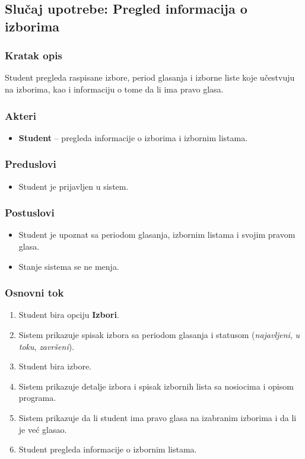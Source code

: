 \subsection{Slučaj upotrebe: Pregled informacija o izborima}

\subsubsection*{Kratak opis}
Student pregleda raspisane izbore, period glasanja i izborne liste koje učestvuju na izborima, kao i informaciju o tome da li ima pravo glasa.

\subsubsection*{Akteri}
\begin{itemize}
    \item \textbf{Student} -- pregleda informacije o izborima i izbornim listama.
\end{itemize}

\subsubsection*{Preduslovi}
\begin{itemize}
    \item Student je prijavljen u sistem.
\end{itemize}

\subsubsection*{Postuslovi}
\begin{itemize}
    \item Student je upoznat sa periodom glasanja, izbornim listama i svojim pravom glasa.
    \item Stanje sistema se ne menja.
\end{itemize}

\subsubsection*{Osnovni tok}
\begin{enumerate}
    \item Student bira opciju \textbf{Izbori}.
    \item Sistem prikazuje spisak izbora sa periodom glasanja i statusom (\textit{najavljeni}, \textit{u toku}, \textit{završeni}).
    \item Student bira izbore.
    \item Sistem prikazuje detalje izbora i spisak izbornih lista sa nosiocima i opisom programa.
    \item Sistem prikazuje da li student ima pravo glasa na izabranim izborima i da li je već glasao.
    \item Student pregleda informacije o izbornim listama.
\end{enumerate}


